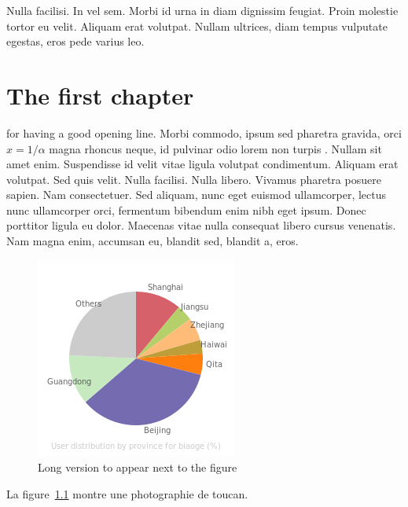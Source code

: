 \begin{savequote}[75mm]
Nulla facilisi. In vel sem. Morbi id urna in diam dignissim feugiat. Proin molestie tortor eu velit. Aliquam erat volutpat. Nullam ultrices, diam tempus vulputate egestas, eros pede varius leo.
\end{savequote}

\chapter{The first chapter}

 for having a good opening line. Morbi commodo, ipsum sed pharetra gravida, orci  $x = 1/\alpha$ magna rhoncus neque, id pulvinar odio lorem non turpis \cite{Guichard2013}. Nullam sit amet enim. Suspendisse id velit vitae ligula volutpat  condimentum. Aliquam erat volutpat. Sed quis velit. Nulla facilisi. Nulla libero. Vivamus pharetra posuere sapien. Nam consectetuer. Sed aliquam, nunc eget euismod ullamcorper, lectus nunc ullamcorper orci, fermentum bibendum enim nibh eget ipsum. Donec porttitor ligula eu dolor. Maecenas vitae nulla consequat libero cursus venenatis. Nam magna enim, accumsan eu, blandit sed, blandit a, eros.

\zh{}


\begin{figure}[h]
    \centering
    \includegraphics{figures/memes/geo_pie_biaoge_Aug_20_2012_Sep_02_2012.png}
    \caption[Short version for LoF]{Long version to appear next to the figure}
    \label{fig:geopie_biaoge}
\end{figure}

La figure~\ref{fig:geopie_biaoge} montre une photographie de toucan.


